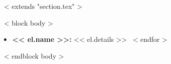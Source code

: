 ~< extends "section.tex" >~

~< block body >~

\begin{itemize}
    ~< for el in items >~
        \item \textbf{<< el.name >>:} << el.details >>
    ~< endfor >~
\end{itemize}

~< endblock body >~

